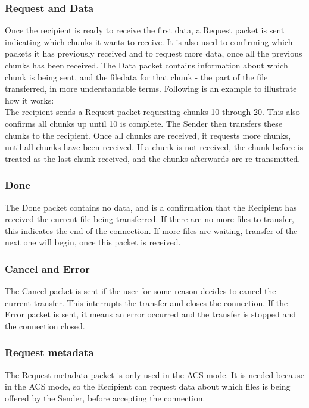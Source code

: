 	\subsubsection*{Request and Data}
	Once the recipient is ready to receive the first data, a Request packet is sent indicating which chunks it wants to receive. It is also used to confirming which packets it has previously received and to request more data, once all the previous chunks has been received. The Data packet contains information about which chunk is being sent, and the filedata for that chunk - the part of the file transferred, in more understandable terms. Following is an example to illustrate how it works:\\
	The recipient sends a Request packet requesting chunks 10 through 20. This also confirms all chunks up until 10 is complete. The Sender then transfers these chunks to the recipient. Once all chunks are received, it requests more chunks, until all chunks have been received. If a chunk is not received, the chunk before is treated as the last chunk received, and the chunks afterwards are re-transmitted.

	\subsubsection*{Done}
	The Done packet contains no data, and is a confirmation that the Recipient has received the current file being transferred. If there are no more files to transfer, this indicates the end of the connection. If more files are waiting, transfer of the next one will begin, once this packet is received.

	\subsubsection*{Cancel and Error}
	The Cancel packet is sent if the user for some reason decides to cancel the current transfer. This interrupts the transfer and closes the connection. If the Error packet is sent, it means an error occurred and the transfer is stopped and the connection closed.

	\subsubsection*{Request metadata}
	The Request metadata packet is only used in the ACS mode. It is needed because in the ACS mode, so the Recipient can request data about which files is being offered by the Sender, before accepting the connection. 


